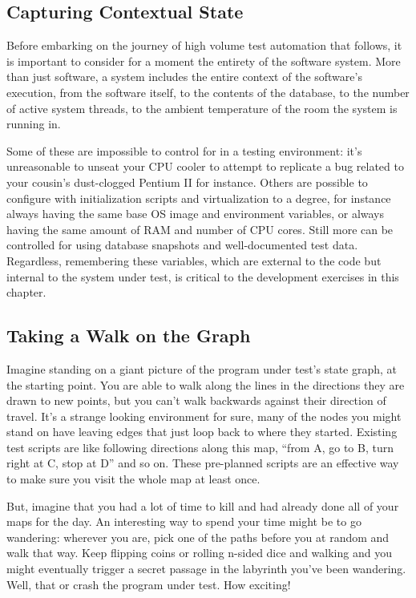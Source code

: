 \subsection{Capturing Contextual State}
Before embarking on the journey of high volume test automation that follows, it is important to consider for a moment the entirety of the software system. More than just software, a system includes the entire context of the software's execution, from the software itself, to the contents of the database, to the number of active system threads, to the ambient temperature of the room the system is running in.

Some of these are impossible to control for in a testing environment: it's unreasonable to unseat your CPU cooler to attempt to replicate a bug related to your cousin's dust-clogged Pentium II for instance. Others are possible to configure with initialization scripts and virtualization to a degree, for instance always having the same base OS image and environment variables, or always having the same amount of RAM and number of CPU cores. Still more can be controlled for using database snapshots and well-documented test data. Regardless, remembering these variables, which are external to the code but internal to the system under test, is critical to the development exercises in this chapter.

\subsection{Taking a Walk on the Graph}
Imagine standing on a giant picture of the program under test's state graph, at the starting point. You are able to walk along the lines in the directions they are drawn to new points, but you can't walk backwards against their direction of travel. It's a strange looking environment for sure, many of the nodes you might stand on have leaving edges that just loop back to where they started. Existing test scripts are like following directions along this map, ``from A, go to B, turn right at C, stop at D'' and so on. These pre-planned scripts are an effective way to make sure you visit the whole map at least once.

But, imagine that you had a lot of time to kill and had already done all of your maps for the day. An interesting way to spend your time might be to go wandering: wherever you are, pick one of the paths before you at random and walk that way. Keep flipping coins or rolling n-sided dice and walking and you might eventually trigger a secret passage in the labyrinth you've been wandering. Well, that or crash the program under test. How exciting!

